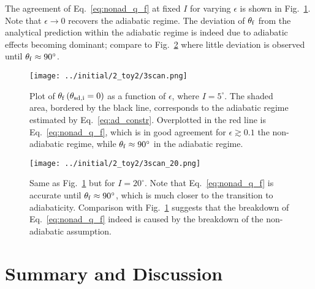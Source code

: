 \documentclass[
        fleqn,
        usenatbib,
        referee,
    ]{mnras}
\newcommand*{\p}[1]{\left(#1\right)}
\begin{document}
The agreement of Eq.~\eqref{eq:nonad_q_f} at fixed $I$ for varying $\epsilon$ is
shown in Fig.~\ref{fig:nonad_3_scan}. Note that $\epsilon \to 0$ recovers the
adiabatic regime. The deviation of $\theta_{\rm f}$ from the analytical
prediction within the adiabatic regime is indeed due to adiabatic effects
becoming dominant; compare to Fig.~\ref{fig:nonad_3_scan_20} where little
deviation is observed until $\theta_{\rm f} \approx 90^\circ$.
\begin{figure}
    \centering
    \texttt{[image: ../initial/2\_toy2/3scan.png]}
    \caption{Plot of $\theta_{\rm  f}\p{\theta_{\rm sd, i} = 0}$ as a function
    of $\epsilon$, where $I = 5^\circ$. The shaded area, bordered by the black
    line, corresponds to the adiabatic regime estimated by
    Eq.~\eqref{eq:ad_constr}. Overplotted in the red line is
    Eq.~\eqref{eq:nonad_q_f}, which is in good agreement for $\epsilon \gtrsim
    0.1$ the non-adiabatic regime, while $\theta_{\rm f} \approx 90^\circ$ in
    the adiabatic regime.}\label{fig:nonad_3_scan}
\end{figure}
\begin{figure}
    \centering
    \texttt{[image: ../initial/2\_toy2/3scan\_20.png]}
    \caption{Same as Fig.~\ref{fig:nonad_3_scan} but for $I=20^\circ$. Note that
    Eq.~\eqref{eq:nonad_q_f} is accurate until $\theta_{\rm f} \approx 90^\circ$,
    which is much closer to the transition to adiabaticity. Comparison with
    Fig.~\ref{fig:nonad_3_scan} suggests that the breakdown of
    Eq.~\eqref{eq:nonad_q_f} indeed is caused by the breakdown of the
    non-adiabatic assumption.}\label{fig:nonad_3_scan_20}
\end{figure}

\section{Summary and Discussion}\label{s:disc}
\end{document}
